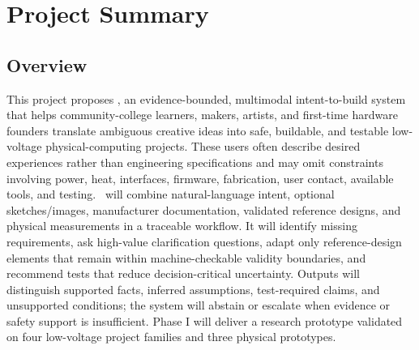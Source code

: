 \documentclass[11pt,letterpaper]{article}
\begin{document}



\section*{Project Summary}


\subsection*{Overview}
This project proposes \VibeFab, an evidence-bounded, multimodal intent-to-build system that helps community-college learners, makers, artists, and first-time hardware founders translate ambiguous creative ideas into safe, buildable, and testable low-voltage physical-computing projects. These users often describe desired experiences rather than engineering specifications and may omit constraints involving power, heat, interfaces, firmware, fabrication, user contact, available tools, and testing. \VibeFab\ will combine natural-language intent, optional sketches/images, manufacturer documentation, validated reference designs, and physical measurements in a traceable workflow. It will identify missing requirements, ask high-value clarification questions, adapt only reference-design elements that remain within machine-checkable validity boundaries, and recommend tests that reduce decision-critical uncertainty. Outputs will distinguish supported facts, inferred assumptions, test-required claims, and unsupported conditions; the system will abstain or escalate when evidence or safety support is insufficient. Phase I will deliver a research prototype validated on four low-voltage project families and three physical prototypes.
\end{document}
